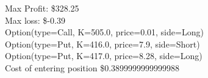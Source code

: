 Max Profit: \$328.25
\\Max loss: \$-0.39
\\Option(type=Call, K=505.0, price=0.01, side=Long)
\\Option(type=Put, K=416.0, price=7.9, side=Short)
\\Option(type=Put, K=417.0, price=8.28, side=Long)
\\Cost of entering position \$0.3899999999999988